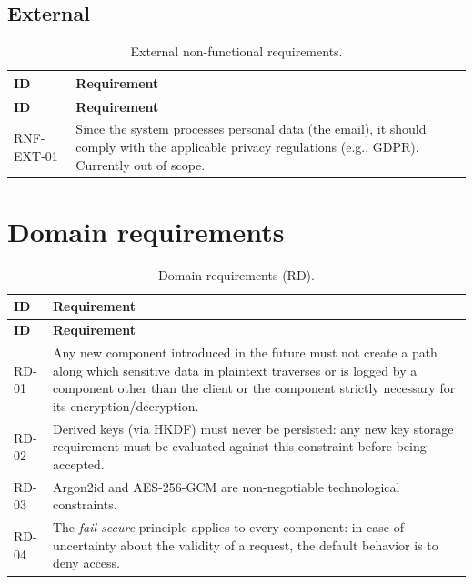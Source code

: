 \subsection{External}

\begin{longtable}{p{2.6cm} p{\dimexpr\linewidth-2.6cm-4\tabcolsep\relax}}
\caption{External non-functional requirements.} \\
\hline
\textbf{ID} & \textbf{Requirement} \\
\hline
\endfirsthead
\hline
\textbf{ID} & \textbf{Requirement} \\
\hline
\endhead
\hline
\endfoot
\hline
\endlastfoot
RNF-EXT-01 & Since the system processes personal data (the email), it should comply with the applicable privacy regulations (e.g., GDPR). Currently out of scope. \\
\end{longtable}

\section{Domain requirements}

\begin{longtable}{p{2.6cm} p{\dimexpr\linewidth-2.6cm-4\tabcolsep\relax}}
\caption{Domain requirements (RD).} \\
\hline
\textbf{ID} & \textbf{Requirement} \\
\hline
\endfirsthead
\hline
\textbf{ID} & \textbf{Requirement} \\
\hline
\endhead
\hline
\endfoot
\hline
\endlastfoot
RD-01 & Any new component introduced in the future must not create a path along which sensitive data in plaintext traverses or is logged by a component other than the client or the component strictly necessary for its encryption/decryption. \\
RD-02 & Derived keys (via HKDF) must never be persisted: any new key storage requirement must be evaluated against this constraint before being accepted. \\
RD-03 & Argon2id and AES-256-GCM are non-negotiable technological constraints. \\
RD-04 & The \emph{fail-secure} principle applies to every component: in case of uncertainty about the validity of a request, the default behavior is to deny access. \\
\end{longtable}
